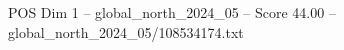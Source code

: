 \begin{textsample}{POS Dim 1 – global\_north\_2024\_05 – Score 44.00 – global\_north\_2024\_05/108534174.txt}
\end{textsample}
